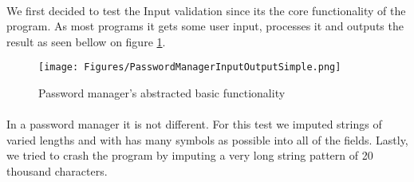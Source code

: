 \paragraph{}
We first decided to test the Input validation since its the core functionality of the program. As most programs it gets some user input, processes it and outputs the result as seen bellow on figure \ref{fig:PM_SimpleFunctionality}.
\begin{figure}[H]
    \centering
    \texttt{[image: Figures/PasswordManagerInputOutputSimple.png]}
    \caption{Password manager's abstracted basic functionality}
    \label{fig:PM_SimpleFunctionality}
\end{figure}
\paragraph{}
In a password manager it is not different. For this test we imputed strings of varied lengths and with has many symbols as possible into all of the fields. Lastly, we tried to crash the program by imputing a very long string pattern of 20 thousand characters.
